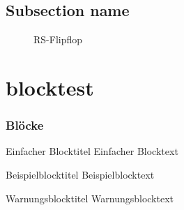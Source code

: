 \subsection{Subsection name}
\begin{frame}
    \begin{figure}[!htb]
      \centering
          \caption{RS-Flipflop}%
          \label{fig:rsflipflop}
        \endminipage\hspace{1cm}   
          \caption{}%
          \label{fig:rsflipfloptakt}
        \endminipage
    \end{figure}
\end{frame}






\section{blocktest}
\begin{frame}
	\frametitle{Blöcke}

    \begin{block}{Einfacher Blocktitel}
        Einfacher Blocktext
    \end{block}
    
    \begin{exampleblock}{Beispielblocktitel}
         Beispielblocktext
    \end{exampleblock}
   
    \begin{alertblock}{Warnungsblocktitel}
         Warnungsblocktext
    \end{alertblock}
    
\end{frame}











